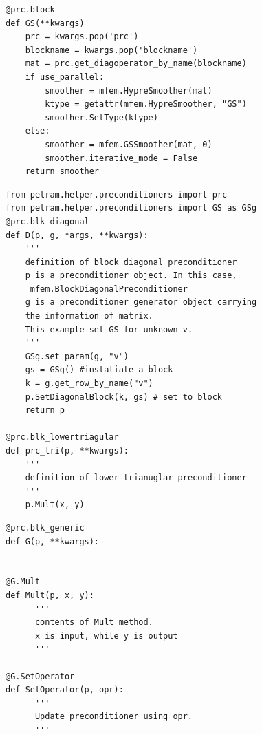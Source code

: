 \documentclass[11pt,a4paper,final]{report}
\begin{document}
\begin{minipage}[c]{0.95\textwidth}
\begin{lstlisting}[caption={A user defined preconditioner block},captionpos=b, frame=single, label={prc1}]
@prc.block
def GS(**kwargs)
    prc = kwargs.pop('prc')
    blockname = kwargs.pop('blockname')
    mat = prc.get_diagoperator_by_name(blockname)
    if use_parallel:
        smoother = mfem.HypreSmoother(mat)
        ktype = getattr(mfem.HypreSmoother, "GS")
        smoother.SetType(ktype)
    else:
        smoother = mfem.GSSmoother(mat, 0)
        smoother.iterative_mode = False
    return smoother
\end{lstlisting}
\end{minipage}

\begin{minipage}[c]{0.95\textwidth}
\begin{lstlisting}[frame=single, caption={A user defined diag/lowertriangular preconditioner},captionpos=b, label={prc2}]
from petram.helper.preconditioners import prc
from petram.helper.preconditioners import GS as GSg
@prc.blk_diagonal
def D(p, g, *args, **kwargs):
    '''
    definition of block diagonal preconditioner
    p is a preconditioner object. In this case,
     mfem.BlockDiagonalPreconditioner
    g is a preconditioner generator object carrying 
    the information of matrix.
    This example set GS for unknown v.  
    '''
    GSg.set_param(g, "v")
    gs = GSg() #instatiate a block
    k = g.get_row_by_name("v")
    p.SetDiagonalBlock(k, gs) # set to block
    return p
    
@prc.blk_lowertriagular
def prc_tri(p, **kwargs):
    '''
    definition of lower trianuglar preconditioner
    '''
    p.Mult(x, y)
\end{lstlisting}
\end{minipage}

\begin{minipage}[c]{0.95\textwidth}
\begin{lstlisting}[caption={A user defined generic preconditioner},captionpos=b, frame=single, label={prc3}]
@prc.blk_generic
def G(p, **kwargs):


@G.Mult
def Mult(p, x, y):
      '''
      contents of Mult method. 
      x is input, while y is output
      '''

@G.SetOperator
def SetOperator(p, opr):
      '''
      Update preconditioner using opr.
      '''
\end{lstlisting}
 \end{minipage}
\end{document}
